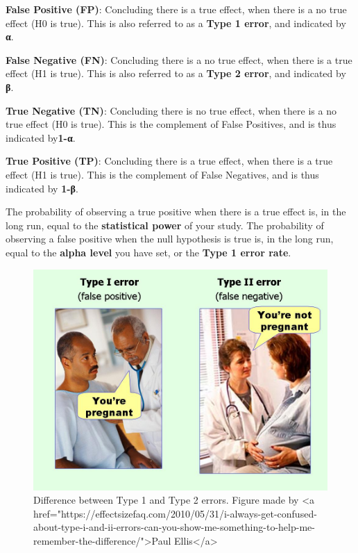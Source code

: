 \documentclass[
]{krantz}
\begin{document}
\textbf{False Positive (FP)}: Concluding there is a true effect, when there is a no true effect (H0 is true). This is also referred to as a \textbf{Type 1 error}, and indicated by \textbf{α}.

\textbf{False Negative (FN)}: Concluding there is a no true effect, when there is a true effect (H1 is true). This is also referred to as a \textbf{Type 2 error}, and indicated by \textbf{β}.

\textbf{True Negative (TN)}: Concluding there is no true effect, when there is a no true effect (H0 is true). This is the complement of False Positives, and is thus indicated by\textbf{1-α}.

\textbf{True Positive (TP)}: Concluding there is a true effect, when there is a true effect (H1 is true). This is the complement of False Negatives, and is thus indicated by \textbf{1-β}.

The probability of observing a true positive when there is a true effect is, in the long run, equal to the \textbf{statistical power} of your study. The probability of observing a false positive when the null hypothesis is true is, in the long run, equal to the \textbf{alpha level} you have set, or the \textbf{Type 1 error rate}.

\begin{figure}

{\centering \includegraphics[width=1\linewidth]{images/type1type2error} 

}

\caption{Difference between Type 1 and Type 2 errors. Figure made by <a href="https://effectsizefaq.com/2010/05/31/i-always-get-confused-about-type-i-and-ii-errors-can-you-show-me-something-to-help-me-remember-the-difference/">Paul Ellis</a>}\label{fig:errortypes}
\end{figure}
\end{document}

